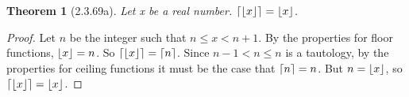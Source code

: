 \documentclass[a4paper, 12pt]{article}
\theoremstyle{plain}
\newtheorem*{theorem*}{Theorem}
\DeclarePairedDelimiter{\floor}{\lfloor}{\rfloor}
\DeclarePairedDelimiter{\ceil}{\lceil}{\rceil}
\begin{document}
	
	\begin{theorem*}[2.3.69a]
		Let x be a real number. $\ceil{\floor{x}} = \floor{x}$.
	\end{theorem*}
	
	\begin{proof}
		Let $n$ be the integer such that $n \le x < n+1$. By the properties for floor functions, 
		$\floor{x} = n$. So $\ceil{\floor{x}} = \ceil{n}$. Since $n-1 < n \le n$ is a tautology, 
		by the properties for ceiling functions it must be the case that $\ceil{n} = n$. 
		But $n = \floor{x}$, so $\ceil{\floor{x}} = \floor{x}$.
	\end{proof}
\end{document}
